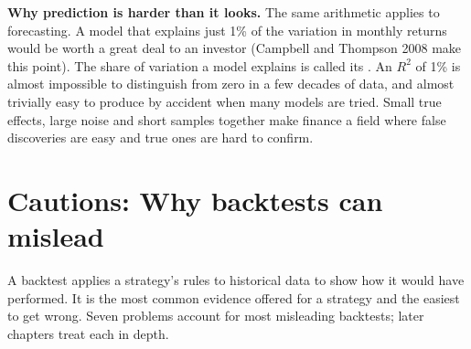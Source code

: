 
\textbf{Why prediction is harder than it looks.} The same arithmetic applies to forecasting. A model that explains just 1\% of the variation in monthly returns would be worth a great deal to an investor (Campbell and Thompson 2008 make this point). The share of variation a model explains is called its . An $R^2$ of 1\% is almost impossible to distinguish from zero in a few decades of data, and almost trivially easy to produce by accident when many models are tried. Small true effects, large noise and short samples together make finance a field where false discoveries are easy and true ones are hard to confirm.

\section{Cautions: Why backtests can mislead}
\label{sec:01-backtests}

A backtest applies a strategy's rules to historical data to show how it would have performed. It is the most common evidence offered for a strategy and the easiest to get wrong. Seven problems account for most misleading backtests; later chapters treat each in depth.

